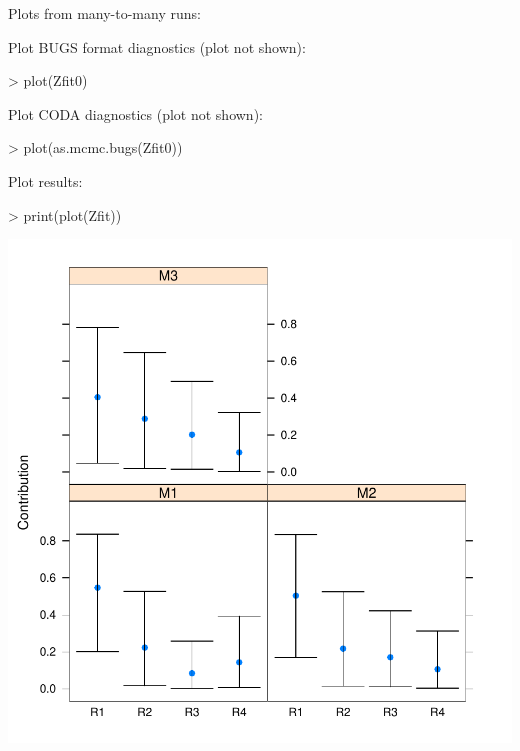 \documentclass[11pt]{article}
\begin{document}
Plots from many-to-many runs:

Plot BUGS format diagnostics (plot not shown):
\begin{Schunk}
\begin{Sinput}
> plot(Zfit0)
\end{Sinput}
\end{Schunk}

Plot CODA diagnostics (plot not shown):
\begin{Schunk}
\begin{Sinput}
> plot(as.mcmc.bugs(Zfit0))
\end{Sinput}
\end{Schunk}

Plot results:
\begin{Schunk}
\begin{Sinput}
> print(plot(Zfit))
\end{Sinput}
\end{Schunk}
\includegraphics{mixstock-041}
\end{document}
